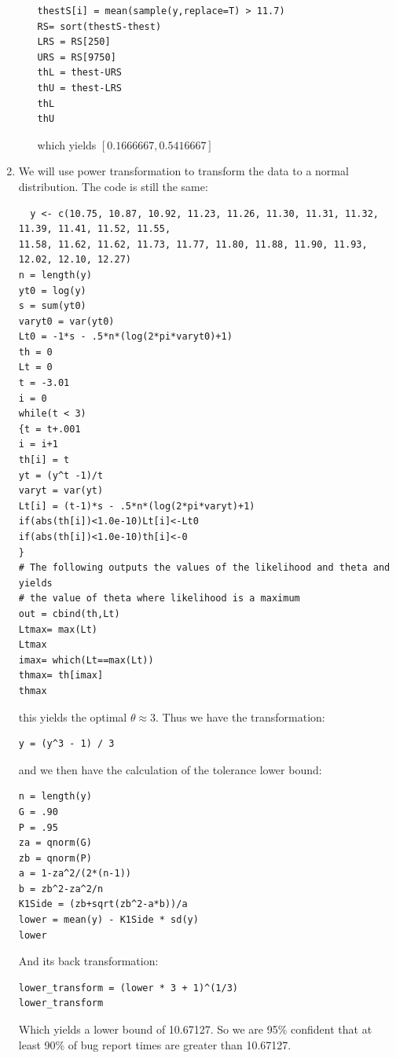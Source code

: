 \documentclass{article}
\begin{document}
\begin{enumerate}
\begin{enumerate}
\begin{verbatim}
thestS[i] = mean(sample(y,replace=T) > 11.7)
RS= sort(thestS-thest)
LRS = RS[250]
URS = RS[9750]
thL = thest-URS
thU = thest-LRS
thL
thU
\end{verbatim}
which yields $[0.1666667, 0.5416667]$
\end{enumerate}
\item We will use power transformation to transform the data to a normal distribution. The code is still the same: \\
\begin{verbatim}
  y <- c(10.75, 10.87, 10.92, 11.23, 11.26, 11.30, 11.31, 11.32, 11.39, 11.41, 11.52, 11.55,
11.58, 11.62, 11.62, 11.73, 11.77, 11.80, 11.88, 11.90, 11.93, 12.02, 12.10, 12.27)
n = length(y)
yt0 = log(y)
s = sum(yt0)
varyt0 = var(yt0)
Lt0 = -1*s - .5*n*(log(2*pi*varyt0)+1)
th = 0
Lt = 0
t = -3.01
i = 0
while(t < 3)
{t = t+.001
i = i+1
th[i] = t
yt = (y^t -1)/t
varyt = var(yt)
Lt[i] = (t-1)*s - .5*n*(log(2*pi*varyt)+1)
if(abs(th[i])<1.0e-10)Lt[i]<-Lt0
if(abs(th[i])<1.0e-10)th[i]<-0
}
# The following outputs the values of the likelihood and theta and yields
# the value of theta where likelihood is a maximum
out = cbind(th,Lt)
Ltmax= max(Lt)
Ltmax
imax= which(Lt==max(Lt))
thmax= th[imax]
thmax
\end{verbatim}
this yields the optimal $\theta \approx 3$. Thus we have the transformation: \\
\begin{verbatim}
y = (y^3 - 1) / 3
\end{verbatim} 
and we then have the calculation of the tolerance lower bound: \\
\begin{verbatim}
n = length(y)
G = .90
P = .95
za = qnorm(G)
zb = qnorm(P)
a = 1-za^2/(2*(n-1))
b = zb^2-za^2/n
K1Side = (zb+sqrt(zb^2-a*b))/a
lower = mean(y) - K1Side * sd(y)
lower
\end{verbatim}
And its back transformation: \\
\begin{verbatim}
lower_transform = (lower * 3 + 1)^(1/3)
lower_transform
\end{verbatim}
Which yields a lower bound of 10.67127. So we are 95\% confident that at least 90\% of bug report times are greater than 10.67127. \\
\end{enumerate}
\end{document}
